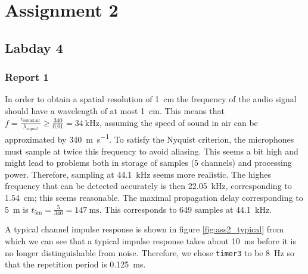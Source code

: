 \documentclass[11pt,titlepage]{report}
\begin{document}
\chapter{Assignment 2}
\section{Labday 4}

\subsection{Report 1}
In order to obtain a spatial resolution of \SI{1}{\centi\meter} the frequency of the audio signal should have a wavelength of at most \SI{1}{\centi\meter}. This means that $f=\frac{v_\text{sound,air}}{\lambda_{signal}}\geq\frac{340}{0.01}=\SI{34}{\kilo\hertz}$, assuming the speed of sound in air can be approximated by \SI{340}{\meter\per\second}. To satisfy the Nyquist criterion, the microphones must sample at twice this frequency to avoid aliasing. This seems a bit high and might lead to problems both in storage of samples (5 channels) and processing power. Therefore, sampling at \SI{44.1}{\kilo\hertz} seems more realistic. The highes frequency that can be detected accurately is then \SI{22.05}{\kilo\hertz}, corresponding to \SI{1.54}{\centi\meter}; this seems reasonable. The maximal propagation delay corresponding to \SI{5}{\meter} is $t_{\text{5m}}=\frac{5}{340}=\SI{147}{\milli\second}$. This corresponds to \num{649} samples at \SI{44.1}{\kilo\hertz}.


A typical channel impulse response is shown in figure \ref{fig:ass2_typical} from which we can see that a typical impulse response takes about \SI{10}{\milli\second} before it is no longer distinguishable from noise. Therefore, we chose \texttt{timer3} to be \SI{8}{\hertz} so that the repetition period is \SI{0.125}{\milli\second}.
\end{document}
